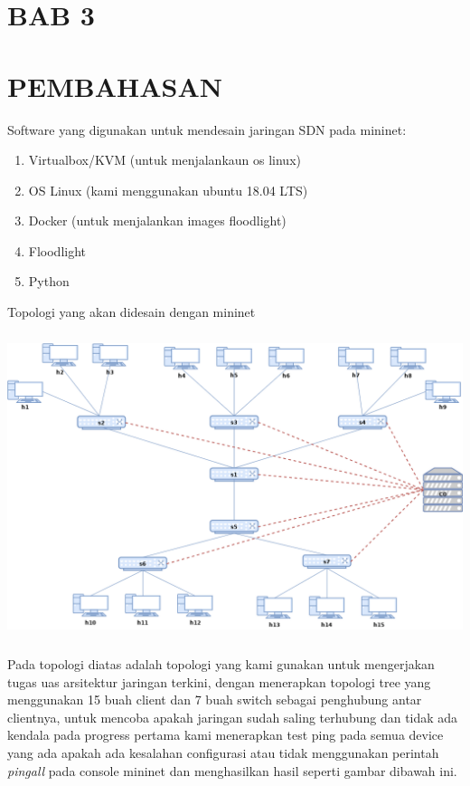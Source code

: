 \begin{center}
\section{BAB 3}
\section{PEMBAHASAN}
\end{center}
Software yang digunakan untuk mendesain jaringan SDN pada mininet:
\liststyleLvii
\begin{enumerate}
\item Virtualbox/KVM (untuk menjalankaun os linux)
\item OS Linux (kami menggunakan ubuntu 18.04 LTS)
\item Docker (untuk menjalankan images floodlight)
\item Floodlight
\item Python
\end{enumerate}

Topologi yang akan didesain dengan mininet
\begin{center}
\includegraphics[width=5.5925in,height=3.5091in]{gambar/topologi.png}
\end{center}

Pada topologi diatas adalah topologi yang kami gunakan untuk mengerjakan tugas uas arsitektur jaringan terkini,
dengan menerapkan topologi tree yang menggunakan 15 buah client dan 7 buah switch sebagai penghubung antar clientnya,
untuk mencoba apakah jaringan sudah saling terhubung dan tidak ada kendala pada progress pertama kami menerapkan test
ping pada semua device yang ada apakah ada kesalahan configurasi atau tidak menggunakan perintah \textit{pingall }pada
console mininet dan menghasilkan hasil seperti gambar dibawah ini.


